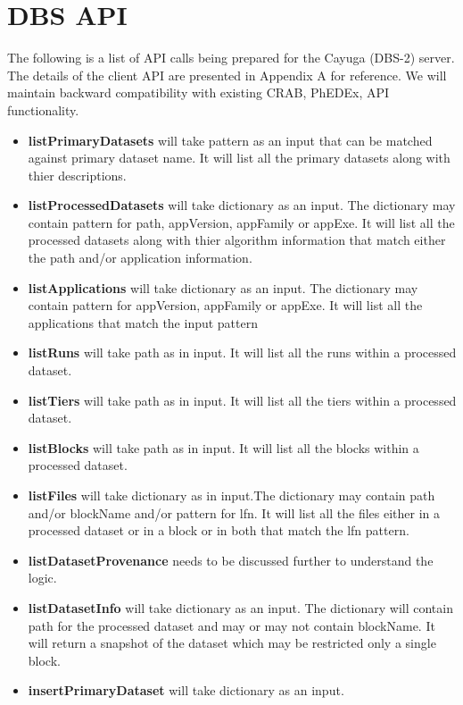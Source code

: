 \documentclass{cmspaper}
\begin{document}

\section{DBS API}

The following is a list of API calls being prepared for the Cayuga (DBS-2) server. The details of the client API are presented in Appendix A for reference. We will maintain backward compatibility with existing CRAB, PhEDEx, API functionality. 
\begin{itemize}
   \item {\bf listPrimaryDatasets} will take pattern as an input that can be matched against primary dataset name. It will list all the primary datasets along with thier descriptions.
   \item {\bf listProcessedDatasets} will take dictionary as an input. The dictionary may contain pattern for path, appVersion, appFamily or appExe. It will list all the processed datasets along with thier algorithm information that match either the path and/or application information.
   \item {\bf listApplications} will take dictionary as an input. The dictionary may contain pattern for appVersion, appFamily or appExe. It will list all the applications that match the input pattern
   \item {\bf listRuns} will take path as in input. It will list all the runs within a processed dataset.
   \item {\bf listTiers} will take path as in input. It will list all the tiers within a processed dataset.
   \item {\bf listBlocks} will take path as in input. It will list all the blocks within a processed dataset.
   \item {\bf listFiles} will take dictionary as in input.The dictionary may contain path and/or blockName and/or pattern for lfn.  It will list all the files either in a processed dataset or in a block or in both that match the lfn pattern.
   \item {\bf listDatasetProvenance} needs to be discussed further to understand the logic.
   \item {\bf listDatasetInfo} will take dictionary as an input. The dictionary will contain path for the processed dataset and may or may not contain blockName. It will return a snapshot of the dataset which may be restricted only a single block.
   \item {\bf insertPrimaryDataset} will take dictionary as an input.

\end{itemize}
\end{document}
